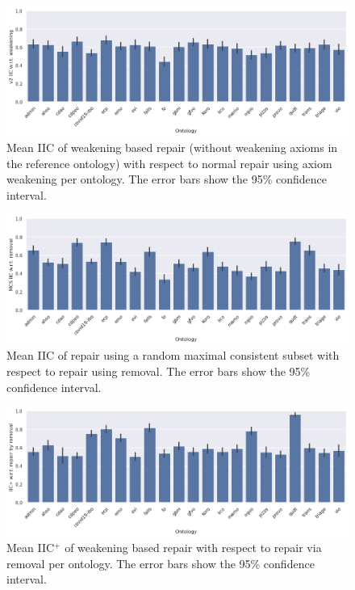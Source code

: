 \begin{figure}[htbp]
  \centering
  \includegraphics[width=\textwidth]{resources/iic-enhance-weaken-ontology-bar.png}
  \caption{Mean IIC of weakening based repair (without weakening axioms in the reference ontology) with respect to normal repair using axiom weakening per ontology. The error bars show the 95\% confidence interval.}
\end{figure}

\begin{figure}[htbp]
  \centering
  \includegraphics[width=\textwidth]{resources/iic-mcs-rem-ontology-bar.png}
  \caption{Mean IIC of repair using a random maximal consistent subset with respect to repair using removal. The error bars show the 95\% confidence interval.}
\end{figure}

\begin{figure}[htbp]
  \centering
  \includegraphics[width=\textwidth]{resources/eiic-remove-ontology-bar.png}
  \caption{Mean IIC$^+$ of weakening based repair with respect to repair via removal per ontology. The error bars show the 95\% confidence interval.}
\end{figure}

